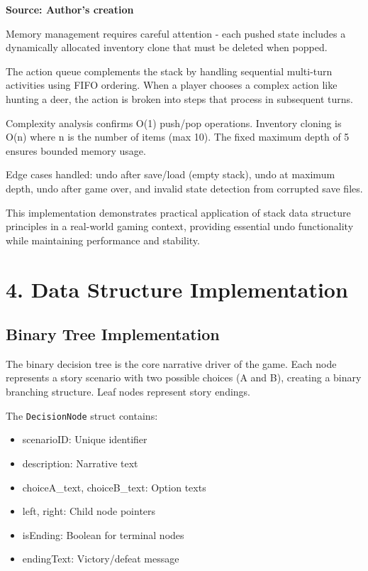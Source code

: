 \documentclass[12pt,a4paper]{article}
\begin{document}
\textbf{Source: Author's creation}

Memory management requires careful attention - each pushed state includes a dynamically allocated inventory clone that must be deleted when popped.

The action queue complements the stack by handling sequential multi-turn activities using FIFO ordering. When a player chooses a complex action like hunting a deer, the action is broken into steps that process in subsequent turns.

Complexity analysis confirms O(1) push/pop operations. Inventory cloning is O(n) where n is the number of items (max 10). The fixed maximum depth of 5 ensures bounded memory usage.

Edge cases handled: undo after save/load (empty stack), undo at maximum depth, undo after game over, and invalid state detection from corrupted save files.

This implementation demonstrates practical application of stack data structure principles in a real-world gaming context, providing essential undo functionality while maintaining performance and stability.

\section{4. Data Structure Implementation}

\subsection{Binary Tree Implementation}
The binary decision tree is the core narrative driver of the game. Each node represents a story scenario with two possible choices (A and B), creating a binary branching structure. Leaf nodes represent story endings.

The \texttt{DecisionNode} struct contains:
\begin{itemize}
	\item scenarioID: Unique identifier
	\item description: Narrative text
	\item choiceA\_text, choiceB\_text: Option texts
	\item left, right: Child node pointers
	\item isEnding: Boolean for terminal nodes
	\item endingText: Victory/defeat message
\end{itemize}
\end{document}
